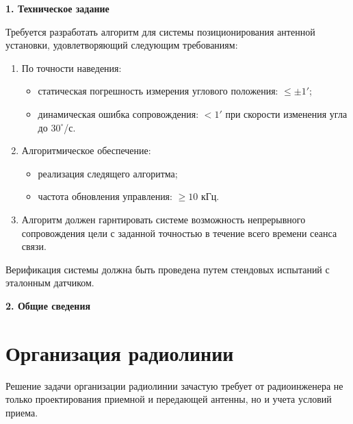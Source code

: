 \newpage

\noindent\textbf{\large 1. Техническое задание}

Требуется разработать алгоритм для системы позиционирования антенной установки, удовлетворяющий следующим требованиям:

\begin{enumerate}[leftmargin=*]
    \item По точности наведения:
    \begin{itemize}[label=--]
        \item статическая погрешность измерения углового положения: $\leq \pm 1'$; 
        \item динамическая ошибка сопровождения: $< 1'$ при скорости изменения угла до $30^\circ$/с.
    \end{itemize}

    \item  Алгоритмическое обеспечение:
    \begin{itemize}[label=--]
        \item реализация следящего алгоритма;
        \item частота обновления управления: $\geq 10$ кГц.
    \end{itemize}

    \item Алгоритм должен гарнтировать системе возможность непрерывного сопровождения цели с заданной точностью 
          в течение всего времени сеанса связи.
  \end{enumerate}
  Верификация системы должна быть проведена путем стендовых испытаний с эталонным датчиком.



\newpage

\noindent\textbf{\large 2. Общие сведения}


\section{Организация радиолинии}

Решение задачи организации радиолинии зачастую требует от радиоинженера не только проектирования приемной и передающей антенны, но и учета условий приема. 

